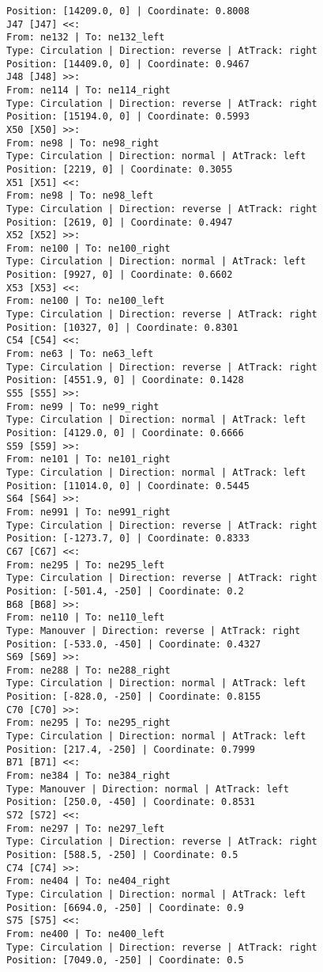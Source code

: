 \begin{lstlisting}[language = {}, tabsize=4, basicstyle=\footnotesize\ttfamily, showspaces=false, showstringspaces=false, caption = Signalling.RNA, label = {lst:EJ4_6}]
Position: [14209.0, 0] | Coordinate: 0.8008
J47 [J47] <<:
From: ne132 | To: ne132_left
Type: Circulation | Direction: reverse | AtTrack: right 
Position: [14409.0, 0] | Coordinate: 0.9467
J48 [J48] >>:
From: ne114 | To: ne114_right
Type: Circulation | Direction: reverse | AtTrack: right 
Position: [15194.0, 0] | Coordinate: 0.5993
X50 [X50] >>:
From: ne98 | To: ne98_right
Type: Circulation | Direction: normal | AtTrack: left 
Position: [2219, 0] | Coordinate: 0.3055
X51 [X51] <<:
From: ne98 | To: ne98_left
Type: Circulation | Direction: reverse | AtTrack: right 
Position: [2619, 0] | Coordinate: 0.4947
X52 [X52] >>:
From: ne100 | To: ne100_right
Type: Circulation | Direction: normal | AtTrack: left 
Position: [9927, 0] | Coordinate: 0.6602
X53 [X53] <<:
From: ne100 | To: ne100_left
Type: Circulation | Direction: reverse | AtTrack: right 
Position: [10327, 0] | Coordinate: 0.8301
C54 [C54] <<:
From: ne63 | To: ne63_left
Type: Circulation | Direction: reverse | AtTrack: right 
Position: [4551.9, 0] | Coordinate: 0.1428
S55 [S55] >>:
From: ne99 | To: ne99_right
Type: Circulation | Direction: normal | AtTrack: left 
Position: [4129.0, 0] | Coordinate: 0.6666
S59 [S59] >>:
From: ne101 | To: ne101_right
Type: Circulation | Direction: normal | AtTrack: left 
Position: [11014.0, 0] | Coordinate: 0.5445
S64 [S64] >>:
From: ne991 | To: ne991_right
Type: Circulation | Direction: reverse | AtTrack: right 
Position: [-1273.7, 0] | Coordinate: 0.8333
C67 [C67] <<:
From: ne295 | To: ne295_left
Type: Circulation | Direction: reverse | AtTrack: right 
Position: [-501.4, -250] | Coordinate: 0.2
B68 [B68] >>:
From: ne110 | To: ne110_left
Type: Manouver | Direction: reverse | AtTrack: right 
Position: [-533.0, -450] | Coordinate: 0.4327
S69 [S69] >>:
From: ne288 | To: ne288_right
Type: Circulation | Direction: normal | AtTrack: left 
Position: [-828.0, -250] | Coordinate: 0.8155
C70 [C70] >>:
From: ne295 | To: ne295_right
Type: Circulation | Direction: normal | AtTrack: left 
Position: [217.4, -250] | Coordinate: 0.7999
B71 [B71] <<:
From: ne384 | To: ne384_right
Type: Manouver | Direction: normal | AtTrack: left 
Position: [250.0, -450] | Coordinate: 0.8531
S72 [S72] <<:
From: ne297 | To: ne297_left
Type: Circulation | Direction: reverse | AtTrack: right 
Position: [588.5, -250] | Coordinate: 0.5
C74 [C74] >>:
From: ne404 | To: ne404_right
Type: Circulation | Direction: normal | AtTrack: left 
Position: [6694.0, -250] | Coordinate: 0.9
S75 [S75] <<:
From: ne400 | To: ne400_left
Type: Circulation | Direction: reverse | AtTrack: right 
Position: [7049.0, -250] | Coordinate: 0.5

\end{lstlisting}

